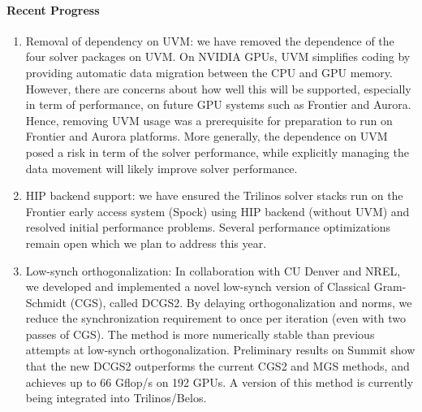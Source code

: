\paragraph{Recent Progress}
\begin{enumerate}
\item Removal of dependency on UVM:
we have removed the dependence of the four solver packages on UVM.
On NVIDIA GPUs, UVM simplifies coding by providing automatic data migration between the CPU and GPU memory. However, there are concerns about how well this will be supported, especially in term of performance, on future GPU systems such as Frontier and Aurora. Hence, removing UVM usage was a prerequisite for preparation to run on Frontier and Aurora platforms. 
More generally, the dependence on UVM posed a risk in term of the solver performance, while explicitly managing the data movement will likely improve solver performance. 

\item HIP backend support:
we have ensured the Trilinos solver stacks run on the Frontier early access system (Spock) using HIP backend (without UVM) and resolved initial performance problems. Several performance optimizations remain open which we plan to address this year.


\item Low-synch orthogonalization: In collaboration with CU Denver and NREL, we developed and implemented a novel low-synch version of Classical Gram-Schmidt (CGS), called DCGS2. By delaying orthogonalization and norms, we reduce the synchronization requirement to once per iteration (even with two passes of CGS). The method is more numerically stable than previous attempts at low-synch orthogonalization. Preliminary results on Summit show that the new DCGS2 outperforms the current CGS2 and MGS methods, and achieves up to 66 Gflop/s on 192 GPUs. A version of this method is currently being integrated into Trilinos/Belos.
\end{enumerate}

